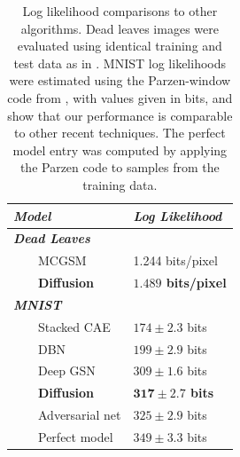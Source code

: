 \documentclass{article}
\begin{document}
\begin{table}
\begin{center}
\begin{tabular}{l|l}
{\em Model} & {\em Log Likelihood} \\
\hline
	\textbf{\em Dead Leaves}
\\
\ \ \ \ MCGSM & 1.244 bits/pixel \\
\ \ \ \ \textbf{Diffusion} & \textbf{$\mathbf{1.489}$ bits/pixel}\\
\hline
	\textbf{\em MNIST}
\\
\ \ \ \ Stacked CAE & $174 \pm 2.3$ bits \\
\ \ \ \ DBN & $199 \pm 2.9$ bits \\
\ \ \ \ Deep GSN & $309 \pm 1.6$ bits \\
\ \ \ \ \textbf{Diffusion} & \textbf{$\mathbf{317 \pm 2.7}$ bits} \\
\ \ \ \ Adversarial net & $325 \pm 2.9$ bits \\
\ \ \ \ Perfect model & $349 \pm 3.3$ bits 
\end{tabular}
\caption{Log likelihood comparisons to other algorithms. Dead leaves images were evaluated using identical training and test data as in \cite{theis2012mixtures}. 
MNIST log likelihoods were estimated using the Parzen-window code from \cite{goodfellowgenerative}, %
with values given in bits,
and show 
that our performance is comparable to other recent techniques.
The perfect model entry was computed by applying the Parzen code to samples from the training data.
\label{tb ll compare}
}
\end{center}
\end{table}
\end{document}
